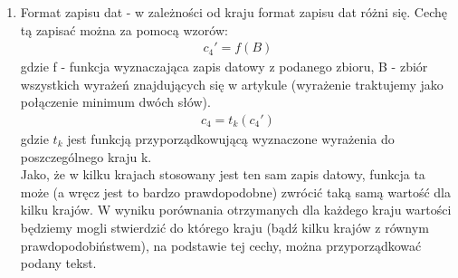 \documentclass{classrep}
\newtheorem{exmp}{Przykład}[section]
\begin{document}
\begin{enumerate}
\begin{exmp}
    . \\
    \end{exmp}W przytoczonym fragmencie zapis daty został wykorzystany 3 razy ("October 1", "1987/88", "June 1"). Wobec tego, uważamy, że opisywana cecha będzie korzystnie wpływać na proces klasyfikacji tekstów. \\

    \item Format zapisu dat - w zależności od kraju format zapisu dat różni się. Cechę tą zapisać można za pomocą wzorów:
    \begin{gather}
        c_4' = f(B)
    \end{gather}
    \indent gdzie f - funkcja wyznaczająca zapis datowy z podanego zbioru, B - zbiór wszystkich wyrażeń znajdujących się w artykule (wyrażenie traktujemy jako połączenie minimum dwóch słów).
    \begin{gather}
        c_4 = t_k(c_4')
    \end{gather}
    \indent gdzie $t_k$ jest funkcją przyporządkowującą wyznaczone wyrażenia do poszczególnego kraju k.\\
    Jako, że w kilku krajach stosowany jest ten sam zapis datowy, funkcja ta może (a wręcz jest to bardzo prawdopodobne) zwrócić taką samą wartość dla kilku krajów. W wyniku porównania otrzymanych dla każdego kraju wartości będziemy mogli stwierdzić do którego kraju (bądź kilku krajów z równym prawdopodobiństwem), na podstawie tej cechy, można przyporządkować podany tekst. 
    \\
    

\end{enumerate}
\end{document}
